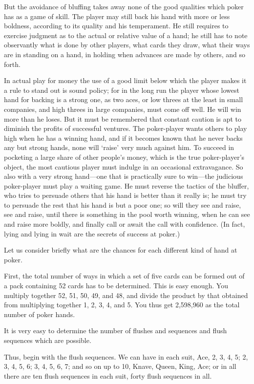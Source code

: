 \documentclass[letterpaper,12pt,oneside,openany]{memoir}
\begin{document}
But the avoidance of bluffing takes away none of
the good qualities which poker has as a game of skill.
The player may still back his hand with more or less
boldness, according to its quality and his temperament.
He still requires to exercise judgment as to the actual
or relative value of a hand; he still has to note observantly
what is done by other players, what cards they
draw, what their ways are in standing on a hand, in
holding when advances are made by others, and so forth.

In actual play for money the use of a good limit
below which the player makes it a rule to stand out is
sound policy; for in the long run the player whose
lowest hand for backing is a strong one, as two aces,
or low threes at the least in small companies, and high
threes in large companies, must come off well. He will
win more than he loses. But it must be remembered
that constant caution is apt to diminish the profits of
successful ventures. The poker-player wants others to
play high when he has a winning hand, and if it
becomes known that he never backs any but strong
hands, none will `raise' very much against him. To
succeed in pocketing a large share of other people's
money, which is the true poker-player's object, the most
cautious player must indulge in an occasional extravagance.
So also with a very strong hand---one that is
practically sure to win---the judicious poker-player
must play a waiting game. He must reverse the tactics
of the bluffer, who tries to persuade others that his hand
is better than it really is; he must try to persuade the
rest that his hand is but a poor one; so will they see
and raise, see and raise, until there is something in the
pool worth winning, when he can see and raise more
boldly, and finally call or await the call with confidence.
(In fact, lying and lying in wait are the secrets of
success at poker.)

Let us consider briefly what are the chances for each
different kind of hand at poker.

First, the total number of ways in which a set of five
cards can be formed out of a pack containing 52 cards
has to be determined. This is easy enough. You multiply
together 52, 51, 50, 49, and 48, and divide the
product by that obtained from multiplying together 1,
2, 3, 4, and 5. You thus get 2,598,960 as the total
number of poker hands.

It is very easy to determine the number of flushes
and sequences and flush sequences which are possible.

Thus, begin with the flush sequences. We can
have in each suit, Ace, 2, 3, 4, 5; 2, 3, 4, 5, 6; 3, 4,
5, 6, 7; and so on up to 10, Knave, Queen, King, Ace;
or in all there are ten flush sequences in each suit, forty
flush sequences in all.
\end{document}
